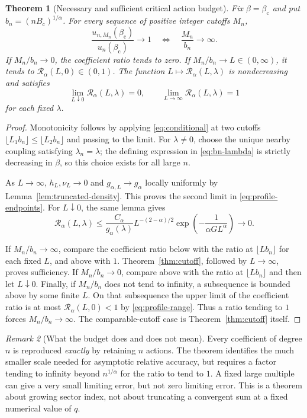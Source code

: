 \documentclass[11pt,a4paper]{article}
\numberwithin{equation}{section}
\newtheorem{theorem}{Theorem}[section]
\theoremstyle{definition}
\theoremstyle{remark}
\newtheorem{remark}[theorem]{Remark}
\newcommand{\bc}{\beta_{\mathrm c}}
\newcommand{\Bc}{B_{\mathrm c}}
\newcommand{\Ra}{\mathcal R_\alpha}
\begin{document}
\begin{theorem}[Necessary and sufficient critical action budget]
\label{thm:budget}
Fix $\beta=\bc$ and put $b_n=(n\Bc)^{1/\alpha}$. For every sequence of
positive integer cutoffs $M_n$,
\begin{equation}\label{eq:budget-iff}
 \frac{u_{n,M_n}(\bc)}{u_n(\bc)}\longrightarrow1
 \quad\Longleftrightarrow\quad \frac{M_n}{b_n}\longrightarrow\infty.
\end{equation}
If $M_n/b_n\to0$, the coefficient ratio tends to zero. If
$M_n/b_n\to L\in(0,\infty)$, it tends to $\Ra(L,0)\in(0,1)$.
The function $L\mapsto\Ra(L,\lambda)$ is nondecreasing and satisfies
\begin{equation}\label{eq:profile-endpoints}
 \lim_{L\downarrow0}\Ra(L,\lambda)=0,\qquad
 \lim_{L\to\infty}\Ra(L,\lambda)=1
\end{equation}
for each fixed $\lambda$.
\end{theorem}
\begin{proof}
Monotonicity follows by applying \eqref{eq:conditional} at two cutoffs
$\lfloor L_1b_n\rfloor\le\lfloor L_2b_n\rfloor$ and passing to the
limit. For $\lambda\ne0$, choose the unique nearby coupling satisfying
$\lambda_n=\lambda$; the defining expression in
\eqref{eq:bn-lambda} is strictly decreasing in $\beta$, so this choice
exists for all large $n$.

As $L\to\infty$, $h_L,\nu_L\to0$ and
$g_{\alpha,L}\to g_\alpha$ locally uniformly by
Lemma~\ref{lem:truncated-density}. This proves the second limit in
\eqref{eq:profile-endpoints}. For $L\downarrow0$, the same lemma gives
\[
 \Ra(L,\lambda)\le
  \frac{C_\alpha}{g_\alpha(\lambda)}
  L^{-(2-\alpha)/2}\exp\left(-\frac1{\alpha G L^\alpha}\right)
  \longrightarrow0.
\]

If $M_n/b_n\to\infty$, compare the coefficient ratio below with the
ratio at $\lfloor Lb_n\rfloor$ for each fixed $L$, and above with $1$.
Theorem~\ref{thm:cutoff}, followed by $L\to\infty$, proves sufficiency.
If $M_n/b_n\to0$, compare above with the ratio at
$\lfloor Lb_n\rfloor$ and then let $L\downarrow0$.
Finally, if $M_n/b_n$ does not tend to infinity, a subsequence is bounded
above by some finite $L$. On that subsequence the upper limit of the
coefficient ratio is at most $\Ra(L,0)<1$ by
\eqref{eq:profile-range}. Thus a ratio tending to $1$ forces
$M_n/b_n\to\infty$. The comparable-cutoff case is
Theorem~\ref{thm:cutoff} itself.
\end{proof}

\begin{remark}[What the budget does and does not mean]
Every coefficient of degree $n$ is reproduced \emph{exactly} by retaining
$n$ actions. The theorem identifies the much smaller scale needed for
asymptotic relative accuracy, but requires a factor tending to infinity
beyond $n^{1/\alpha}$ for the ratio to tend to $1$. A fixed large multiple
can give a very small limiting error, but not zero limiting error.
This is a theorem about growing sector index, not about truncating a
convergent sum at a fixed numerical value of $q$.
\end{remark}
\end{document}
